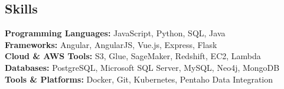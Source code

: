 \documentclass[margin, 10pt]{res} %
\begin{document}
\begin{resume}
\section{Skills}
\textbf{Programming Languages:} JavaScript, Python, SQL, Java \\
\textbf{Frameworks:} Angular, AngularJS, Vue.js, Express, Flask \\
\textbf{Cloud & AWS Tools:} S3, Glue, SageMaker, Redshift, EC2, Lambda \\
\textbf{Databases:} PostgreSQL, Microsoft SQL Server, MySQL, Neo4j, MongoDB \\
\textbf{Tools & Platforms:} Docker, Git, Kubernetes, Pentaho Data Integration
\end{resume}
\end{document}

